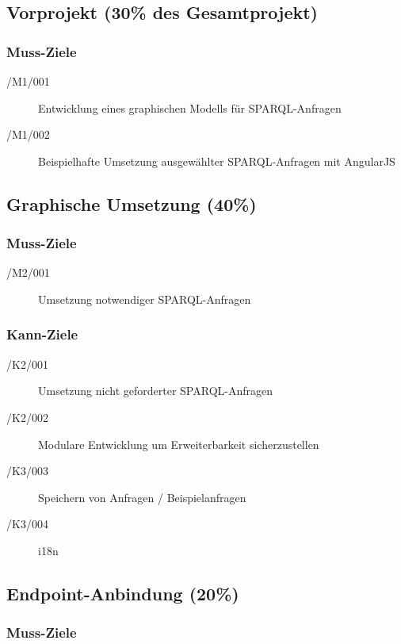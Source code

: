 \subsection*{Vorprojekt (30\% des Gesamtprojekt)}

\subsubsection*{Muss-Ziele}

\begin{description}
\item[/M1/001] Entwicklung eines graphischen Modells für SPARQL-Anfragen
\item[/M1/002] Beispielhafte Umsetzung ausgewählter SPARQL-Anfragen mit AngularJS
\end{description}

\subsection*{Graphische Umsetzung (40\%)}

\subsubsection*{Muss-Ziele}

\begin{description}
\item[/M2/001] Umsetzung notwendiger SPARQL-Anfragen
\end{description}

\subsubsection*{Kann-Ziele}
\begin{description}
\item[/K2/001] Umsetzung nicht geforderter SPARQL-Anfragen
\item[/K2/002] Modulare Entwicklung um Erweiterbarkeit sicherzustellen
\item[/K3/003] Speichern von Anfragen / Beispielanfragen
\item[/K3/004] i18n
\end{description}

\subsection*{Endpoint-Anbindung (20\%)}

\subsubsection*{Muss-Ziele}


